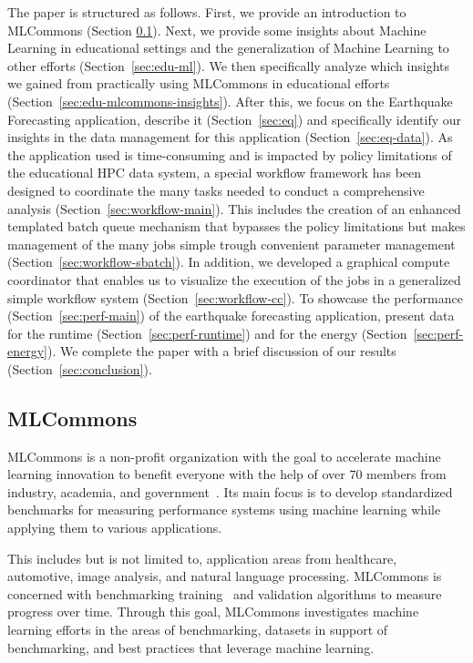 \documentclass[utf8]{FrontiersinVancouver} %
\begin{document}
The paper is structured as follows. First, we provide an introduction
to MLCommons (Section \ref{sec:mlcommons}).  Next, we provide some
insights about Machine Learning in educational settings and the
generalization of Machine Learning to other efforts
(Section~\ref{sec:edu-ml}). We then specifically analyze which
insights we gained from practically using MLCommons in educational
efforts (Section~\ref{sec:edu-mlcommons-insights}). After this, we
focus on the Earthquake Forecasting application, describe it
(Section~\ref{sec:eq}) and specifically identify our insights in the
data management for this application (Section~\ref{sec:eq-data}).  As
the application used is time-consuming and is impacted by policy
limitations of the educational HPC data system, a special workflow
framework has been designed to coordinate the many tasks needed to
conduct a comprehensive analysis
(Section~\ref{sec:workflow-main}). This includes the creation of an
enhanced templated batch queue mechanism that bypasses the policy
limitations but makes management of the many jobs simple trough
convenient parameter management
(Section~\ref{sec:workflow-sbatch}). In addition, we developed a
graphical compute coordinator that enables us to visualize the
execution of the jobs in a generalized simple workflow system
(Section~\ref{sec:workflow-cc}).  To showcase the performance
(Section~\ref{sec:perf-main}) of the earthquake forecasting
application, present data for the runtime
(Section~\ref{sec:perf-runtime}) and for the energy
(Section~\ref{sec:perf-energy}). We complete the paper with a brief
discussion of our results (Section~\ref{sec:conclusion}).


\subsection{MLCommons}
\label{sec:mlcommons}

MLCommons is a non-profit organization with the goal to accelerate
machine learning innovation to benefit everyone with the help of over
70 members from industry, academia, and
government~\citep{www-mlcommons}.  Its main focus is to develop
standardized benchmarks for measuring performance systems using
machine learning while applying them to various applications.

This includes but is not limited to, application areas from
healthcare, automotive, image analysis, and natural language
processing. MLCommons is concerned with benchmarking
training~\citep{mlperf-training} and validation algorithms to measure
progress over time. Through this goal, MLCommons investigates machine
learning efforts in the areas of benchmarking, datasets in support of
benchmarking, and best practices that leverage machine learning.
\end{document}
